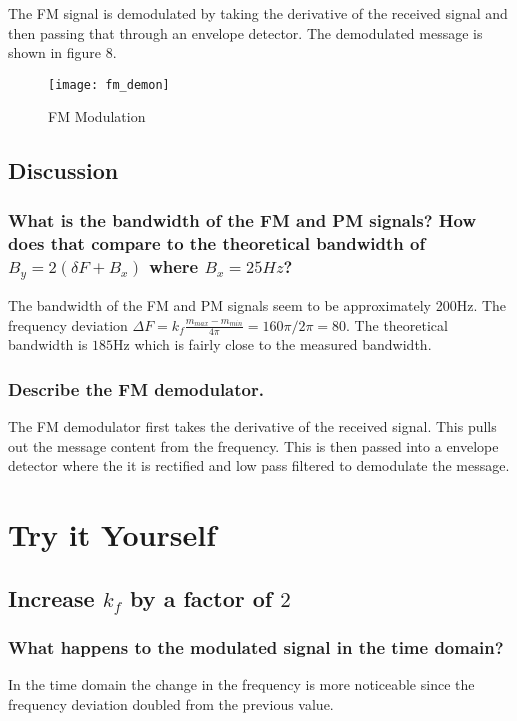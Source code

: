 \documentclass{article}
\begin{document}
    The FM signal is demodulated by taking the derivative of the received signal and then passing
    that through an envelope detector. The demodulated message is shown in figure 8.

    \begin{figure}[!htb]
        \centering
        \texttt{[image: fm\_demon]}
        \caption{FM Modulation}
    \end{figure}

    \subsection{Discussion}
    \subsubsection{What is the bandwidth of the FM and PM signals? How does that compare to the
    theoretical bandwidth of $B_y = 2(\delta F + B_x)$ where $B_x = 25Hz$?}

    The bandwidth of the FM and PM signals seem to be approximately 200Hz. The frequency deviation
    $\Delta F = k_f \frac{m_{max}-m_{min}}{4\pi} = 160\pi / 2\pi = 80$. The theoretical bandwidth is
    $185$Hz which is fairly close to the measured bandwidth. 

    \subsubsection{Describe the FM demodulator.}

    The FM demodulator first takes the derivative of the received signal. This pulls out the message 
    content from the frequency. This is then passed into a envelope detector where the it is rectified 
    and low pass filtered to demodulate the message. 

    \section{Try it Yourself}
    \subsection{Increase $k_f$ by a factor of $2$}
    \subsubsection{What happens to the modulated signal in the time domain?}
    In the time domain the change in the frequency is more noticeable since the frequency deviation doubled
    from the previous value.
\end{document}
